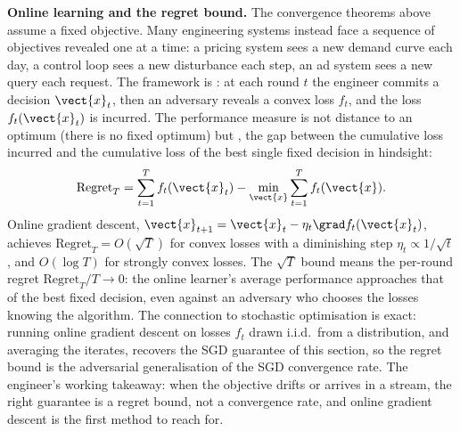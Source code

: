 \begin{mastery}
\textbf{Online learning and the regret bound.} The convergence theorems
above assume a fixed objective. Many engineering systems instead face a
sequence of objectives revealed one at a time: a pricing system sees a
new demand curve each day, a control loop sees a new disturbance each
step, an ad system sees a new query each request. The framework is
: at each round $t$ the engineer
commits a decision $\vect{x}_{t}$, then an adversary reveals a convex
loss $f_{t}$, and the loss $f_{t}(\vect{x}_{t})$ is incurred. The
performance measure is not distance to an optimum (there is no fixed
optimum) but , the gap between the cumulative loss
incurred and the cumulative loss of the best single fixed decision in
hindsight:
\[
\mathrm{Regret}_{T} = \sum_{t=1}^{T} f_{t}(\vect{x}_{t}) -
\min_{\vect{x}} \sum_{t=1}^{T} f_{t}(\vect{x}).
\]
Online gradient descent, $\vect{x}_{t+1} = \vect{x}_{t} - \eta_{t}
\grad f_{t}(\vect{x}_{t})$, achieves $\mathrm{Regret}_{T} =
O(\sqrt{T})$ for convex losses with a diminishing step
$\eta_{t} \propto 1/\sqrt{t}$, and $O(\log T)$ for strongly convex
losses. The $\sqrt{T}$ bound means the per-round regret
$\mathrm{Regret}_{T}/T \to 0$: the online learner's average
performance approaches that of the best fixed decision, even against an
adversary who chooses the losses knowing the algorithm. The connection
to stochastic optimisation is exact: running online gradient descent on
losses $f_{t}$ drawn i.i.d.\ from a distribution, and averaging the
iterates, recovers the SGD guarantee of this section, so the regret
bound is the adversarial generalisation of the SGD convergence rate.
The engineer's working takeaway: when the objective drifts or arrives
in a stream, the right guarantee is a regret bound, not a convergence
rate, and online gradient descent is the first method to reach for.
\end{mastery}

